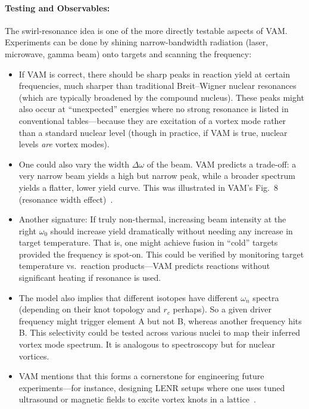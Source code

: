 \documentclass[a4paper,12pt]{article}
\begin{document}
\paragraph{Testing and Observables:} The swirl-resonance idea is one of the more directly testable aspects of VAM. Experiments can be done by shining narrow-bandwidth radiation (laser, microwave, gamma beam) onto targets and scanning the frequency:
\begin{itemize}
    \item If VAM is correct, there should be sharp peaks in reaction yield at certain frequencies, much sharper than traditional Breit--Wigner nuclear resonances (which are typically broadened by the compound nucleus). These peaks might also occur at ``unexpected'' energies where no strong resonance is listed in conventional tables---because they are excitation of a vortex mode rather than a standard nuclear level (though in practice, if VAM is true, nuclear levels \textit{are} vortex modes).

    \item One could also vary the width $\Delta\omega$ of the beam. VAM predicts a trade-off: a very narrow beam yields a high but narrow peak, while a broader spectrum yields a flatter, lower yield curve. This was illustrated in VAM's Fig.~8 (resonance width effect)~\cite{vamcore}.

    \item Another signature: If truly non-thermal, increasing beam intensity at the right $\omega_0$ should increase yield dramatically without needing any increase in target temperature. That is, one might achieve fusion in ``cold'' targets provided the frequency is spot-on. This could be verified by monitoring target temperature vs.\ reaction products---VAM predicts reactions without significant heating if resonance is used.

    \item The model also implies that different isotopes have different $\omega_n$ spectra (depending on their knot topology and $r_c$ perhaps). So a given driver frequency might trigger element A but not B, whereas another frequency hits B. This selectivity could be tested across various nuclei to map their inferred vortex mode spectrum. It is analogous to spectroscopy but for nuclear vortices.

    \item VAM mentions that this forms a cornerstone for engineering future experiments---for instance, designing LENR setups where one uses tuned ultrasound or magnetic fields to excite vortex knots in a lattice~\cite{vamcore}.
\end{itemize}
\end{document}
